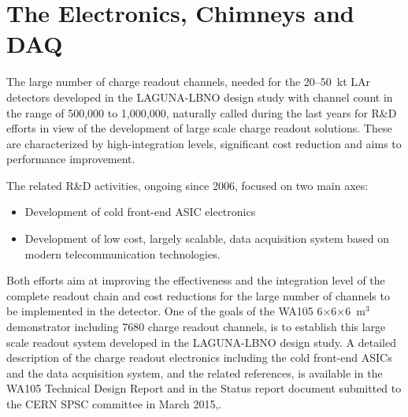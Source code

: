 \section{The Electronics, Chimneys and DAQ}
\label{sec:detectors-fd-alt-elec}

The large number of charge readout channels, needed for the 20--50~kt
LAr detectors developed in the LAGUNA-LBNO design study with channel
count in the range of 500,000 to 1,000,000, naturally called during
the last years for R\&D efforts in view of the development of large
scale charge readout solutions. These are characterized by
high-integration levels, significant cost reduction and aims to
performance improvement.

The related R\&D activities, ongoing since 2006, focused on two main axes:
\begin {itemize} 
\item{Development of cold front-end ASIC electronics}
\item{Development of low cost, largely scalable, data acquisition system based on modern telecommunication technologies.}
\end{itemize}

Both efforts aim at improving the effectiveness and the integration
level of the complete readout chain and cost reductions for the large
number of channels to be implemented in the detector. One of the goals
of the WA105 6$\times$6$\times$6~m$^3$ demonstrator including 7680
charge readout channels, is to establish this large scale readout
system developed in the LAGUNA-LBNO design study. A detailed
description of the charge readout electronics including the cold
front-end ASICs and the data acquisition system, and the related
references, is available in the WA105 Technical Design Report and in
the Status report document submitted to the CERN SPSC committee in
March 2015\cite{WA105_TDR},\cite{WA105_SREP}.

